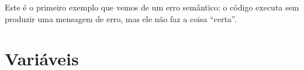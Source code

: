 
Este é o primeiro exemplo que vemos de um erro semântico: o código 
executa sem produzir uma mensagem de erro, mas ele não faz a 
coisa ``certa''.

\section{Variáveis}


